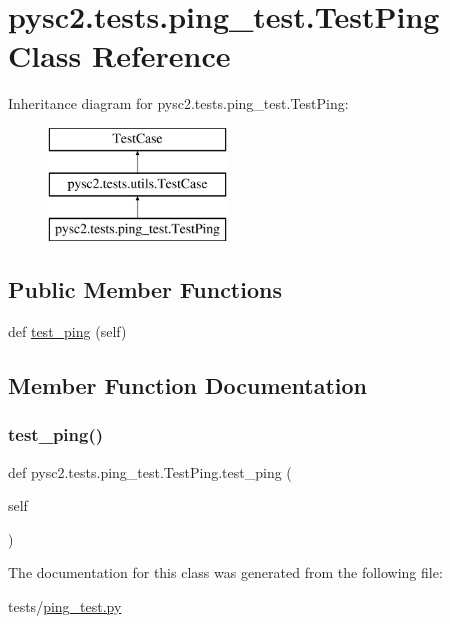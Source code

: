 \hypertarget{classpysc2_1_1tests_1_1ping__test_1_1_test_ping}{}\section{pysc2.\+tests.\+ping\+\_\+test.\+Test\+Ping Class Reference}
\label{classpysc2_1_1tests_1_1ping__test_1_1_test_ping}
Inheritance diagram for pysc2.\+tests.\+ping\+\_\+test.\+Test\+Ping\+:\begin{figure}[H]
\begin{center}
\leavevmode
\includegraphics[height=3.000000cm]{classpysc2_1_1tests_1_1ping__test_1_1_test_ping}
\end{center}
\end{figure}
\subsection*{Public Member Functions}
\begin{DoxyCompactItemize}
\item 
def \mbox{\hyperlink{classpysc2_1_1tests_1_1ping__test_1_1_test_ping_a99b966ba8b49cc947c3ea28a458c6dce}{test\+\_\+ping}} (self)
\end{DoxyCompactItemize}


\subsection{Member Function Documentation}
\mbox{\label{classpysc2_1_1tests_1_1ping__test_1_1_test_ping_a99b966ba8b49cc947c3ea28a458c6dce}} 
\subsubsection{\texorpdfstring{test\+\_\+ping()}{test\_ping()}}
{\footnotesize\ttfamily def pysc2.\+tests.\+ping\+\_\+test.\+Test\+Ping.\+test\+\_\+ping (\begin{DoxyParamCaption}\item[{}]{self }\end{DoxyParamCaption})}



The documentation for this class was generated from the following file\+:\begin{DoxyCompactItemize}
\item 
tests/\mbox{\hyperlink{ping__test_8py}{ping\+\_\+test.\+py}}\end{DoxyCompactItemize}
